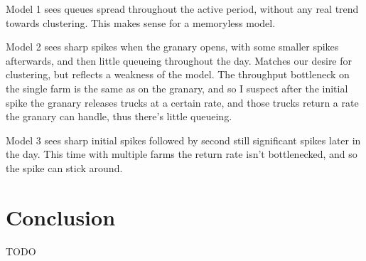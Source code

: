 \documentclass[a4paper, 10.5pt, oneside]{report}
\begin{document}
Model 1 sees queues spread throughout the active period, without any real trend towards clustering.
This makes sense for a memoryless model.

Model 2 sees sharp spikes when the granary opens, with some smaller spikes afterwards, and then little
queueing throughout the day. Matches our desire for clustering, but reflects a weakness of the model.
The throughput bottleneck on the single farm is the same as on the granary, and so I suspect
after the initial spike the granary releases trucks at a certain rate, and those trucks return
a rate the granary can handle, thus there's little queueing.

Model 3 sees sharp initial spikes followed by second still significant spikes later in the day.
This time with multiple farms the return rate isn't bottlenecked, and so the spike can stick around.





\chapter{Conclusion}
TODO


\printbibliography
\end{document}
